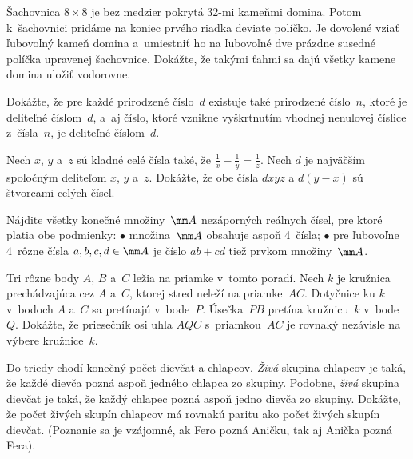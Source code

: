{%
Šachovnica $8\times 8$ je bez medzier pokrytá 32-mi kameňmi domina. Potom k~šachovnici pridáme na koniec prvého riadka deviate políčko. Je dovolené vziať ľubovoľný kameň domina a~umiestniť ho na ľubovoľné dve prázdne susedné políčka upravenej šachovnice. Dokážte, že takými ťahmi sa dajú všetky kamene domina uložiť vodorovne.}

{%
Dokážte, že pre každé prirodzené číslo~$d$ existuje také prirodzené číslo~$n$, ktoré je deliteľné číslom~$d$, a~aj číslo, ktoré vznikne vyškrtnutím vhodnej nenulovej číslice z~čísla~$n$, je deliteľné číslom~$d$.}

{%
Nech $x$, $y$ a~$z$ sú kladné celé čísla také, že $\frac1x-\frac1y=\frac1z$.
Nech $d$ je najväčším spoločným deliteľom $x$, $y$ a~$z$. Dokážte, že obe čísla $dxyz$ a $d(y-x)$
sú štvorcami celých čísel.}

{%
Nájdite všetky konečné množiny~$\mm A$ nezáporných reálnych čísel, pre ktoré platia obe podmienky:
\ite $\bullet$ množina~$\mm A$ obsahuje aspoň 4~čísla;
\ite $\bullet$ pre ľubovoľne 4~rôzne čísla $a,b,c,d \in\mm A$ je číslo $ab + cd$ tiež prvkom množiny~$\mm A$.
}

{%
Tri rôzne body $A$, $B$ a~$C$ ležia na priamke v~tomto poradí. Nech $k$ je kružnica prechádzajúca cez $A$ a~$C$, ktorej stred neleží na priamke~$AC$. Dotyčnice ku $k$ v~bodoch $A$ a~$C$ sa pretínajú v~bode~$P$. Úsečka~$PB$ pretína kružnicu~$k$ v~bode~$Q$. Dokážte, že priesečník osi uhla $AQC$ s~priamkou~$AC$ je rovnaký nezávisle na výbere kružnice~$k$.}

{%
Do triedy chodí konečný počet dievčat a chlapcov. {\it Živá\/} skupina chlapcov je taká, že každé dievča pozná aspoň jedného chlapca zo skupiny. Podobne, {\it živá\/} skupina dievčat je taká, že každý chlapec pozná aspoň jedno dievča zo skupiny. Dokážte, že počet živých skupín chlapcov má rovnakú paritu ako počet živých skupín dievčat. (Poznanie sa je vzájomné, ak Fero pozná Aničku, tak aj Anička pozná Fera).}

